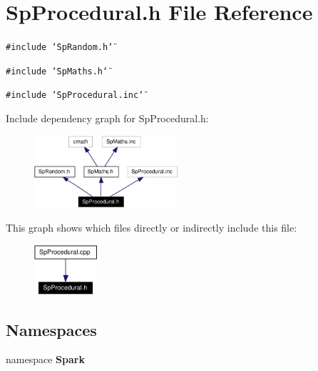 \section{Sp\-Procedural.h File Reference}
\label{SpProcedural_8h}
{\tt \#include \char`\"{}Sp\-Random.h\char`\"{}}\par
{\tt \#include \char`\"{}Sp\-Maths.h\char`\"{}}\par
{\tt \#include \char`\"{}Sp\-Procedural.inc\char`\"{}}\par


Include dependency graph for Sp\-Procedural.h:\begin{figure}[H]
\begin{center}
\leavevmode
\includegraphics[width=151pt]{SpProcedural_8h__incl}
\end{center}
\end{figure}


This graph shows which files directly or indirectly include this file:\begin{figure}[H]
\begin{center}
\leavevmode
\includegraphics[width=66pt]{SpProcedural_8h__dep__incl}
\end{center}
\end{figure}
\subsection*{Namespaces}
\begin{CompactItemize}
\item 
namespace {\bf Spark}
\end{CompactItemize}
